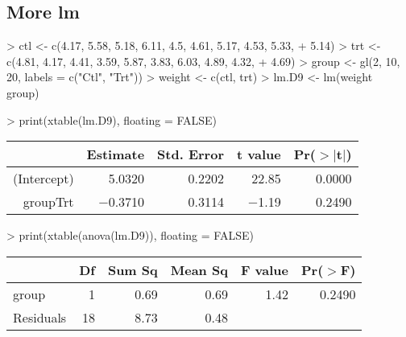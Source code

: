 \documentclass[letterpaper]{article}
\begin{document}
\subsection{More lm}
\begin{Schunk}
\begin{Sinput}
> ctl <- c(4.17, 5.58, 5.18, 6.11, 4.5, 4.61, 5.17, 4.53, 5.33, 
+     5.14)
> trt <- c(4.81, 4.17, 4.41, 3.59, 5.87, 3.83, 6.03, 4.89, 4.32, 
+     4.69)
> group <- gl(2, 10, 20, labels = c("Ctl", "Trt"))
> weight <- c(ctl, trt)
> lm.D9 <- lm(weight ~ group)
\end{Sinput}
\end{Schunk}
\begin{Schunk}
\begin{Sinput}
> print(xtable(lm.D9), floating = FALSE)
\end{Sinput}
% latex table generated in R 2.6.0 by xtable 1.5-2 package
% Wed Oct 10 14:26:36 2007
\begin{tabular}{rrrrr}
  \hline
 & Estimate & Std. Error & t value & Pr($>$$|$t$|$) \\
  \hline
(Intercept) & 5.0320 & 0.2202 & 22.85 & 0.0000 \\
  groupTrt & $-$0.3710 & 0.3114 & $-$1.19 & 0.2490 \\
   \hline
\end{tabular}\end{Schunk}


\begin{Schunk}
\begin{Sinput}
> print(xtable(anova(lm.D9)), floating = FALSE)
\end{Sinput}
% latex table generated in R 2.6.0 by xtable 1.5-2 package
% Wed Oct 10 14:26:36 2007
\begin{tabular}{lrrrrr}
  \hline
 & Df & Sum Sq & Mean Sq & F value & Pr($>$F) \\
  \hline
group & 1 & 0.69 & 0.69 & 1.42 & 0.2490 \\
  Residuals & 18 & 8.73 & 0.48 &  &  \\
   \hline
\end{tabular}\end{Schunk}
\end{document}
